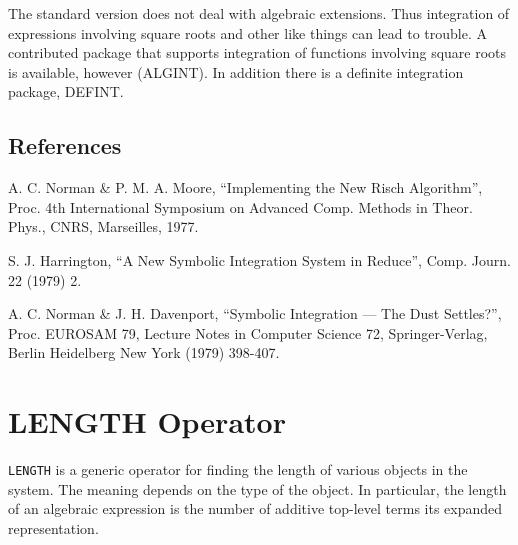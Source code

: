 The standard version does not deal with algebraic extensions. Thus
integration of expressions involving square roots and other like things
can lead to trouble.  A contributed package that supports integration of
functions involving square roots is available, however
(ALGINT).
In addition there is a definite integration
package, DEFINT.

\subsection{References}

        A. C. Norman \& P. M. A. Moore, ``Implementing the New Risch
                Algorithm'', Proc. 4th International Symposium on Advanced
                Comp. Methods in Theor. Phys., CNRS, Marseilles, 1977.

        S. J. Harrington, ``A New Symbolic Integration System in Reduce'',
                Comp. Journ. 22 (1979) 2.

        A. C. Norman \& J. H. Davenport, ``Symbolic Integration --- The Dust
                Settles?'', Proc. EUROSAM 79, Lecture Notes in Computer
                Science 72, Springer-Verlag, Berlin Heidelberg New York
                (1979) 398-407.

%
%
%

\section{LENGTH Operator}
\hypertarget{operator:LENGTH}{}
\texttt{LENGTH} is a generic operator for finding the
length of various objects in the system.  The meaning depends on the type
of the object.  In particular, the length of an algebraic expression is
the number of additive top-level terms its expanded representation.

